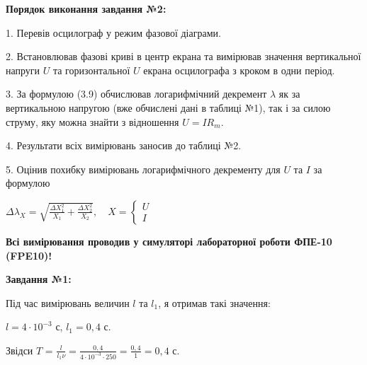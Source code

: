 \documentclass[12pt,a4paper]{article}
\begin{document}
    \setlength{\parindent}{0pt}

    \textbf{Порядок виконання завдання №2:}

    \vspace{1em} %

    \setlength{\parindent}{1.5em}

    1. Перевів осцилограф у режим фазової діаграми.
    
    2. Встановлював фазові криві в центр екрана та вимірював значення вертикальної напруги $U$ та горизонтальної $U$ екрана осцилографа з кроком в одни період.

    3. За формулою (3.9) обчислював логарифмічний декремент $\lambda$ як за вертикальною напругою (вже обчислені дані в таблиці №1), так і за силою струму, яку можна знайти з відношення $U = IR_m$.

    4. Результати всіх вимірювань заносив до таблиці №2.

    5. Оцінив похибку вимірювань логарифмічного декременту для $U$ та $I$ за формулою

    \begin{center}
        $\displaystyle \Delta \lambda_X = \sqrt{\frac{\Delta X_1^2}{X_1} + \frac{\Delta X_2^2}{X_2}}, \quad X = 
        \begin{cases}
        U\\
        I
        \end{cases}$
    \end{center}

    \vspace{1em} %
    \setlength{\parindent}{0pt}

    \textbf{Всі вимірювання проводив у симуляторі лабораторної роботи ФПЕ-10 (FPE10)!}

    \newpage

    \textbf{\large Завдання №1:}

    \vspace{1em} %

    Під час вимірювань величин $l$ та $l_1$, я отримав такі значення:

    \vspace{1em} %

    $l = 4 \cdot 10^{-3}$ с, $l_1 = 0,4$ с.

    \vspace{1em} %

    Звідси $T$ = $\displaystyle \frac{l}{l_1 \nu} = \frac{0,4}{4 \cdot 10^{-3} \cdot 250} = \frac{0,4}{1} = 0,4$ с.
\end{document}
